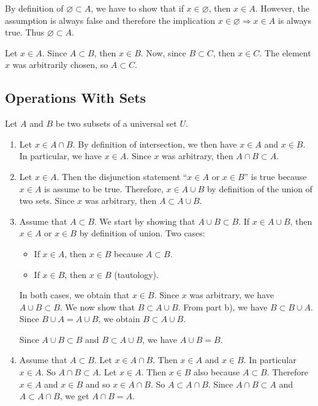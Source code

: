 \begin{problem}
By definition of $\varnothing \subset A$, we have to show that if $x \in \varnothing$, then $x \in A$. However, the assumption is always false and therefore the implication $x \in \varnothing \Rightarrow x \in A$ is always true. Thus $\varnothing \subset A$.
\end{problem}

\begin{problem}
Let $x \in A$. Since $A \subset B$, then $x \in B$. Now, since $B \subset C$, then $x \in C$. The element $x$ was arbitrarily chosen, so $A \subset C$.
\end{problem}

\subsection{Operations With Sets}

\begin{problem}
Let $A$ and $B$ be two subsets of a universal set $U$.
    \begin{enumerate}[label=\alph*)]
        \item Let $x \in A \cap B$. By definition of intersection, we then have $x \in A$ and $x \in B$. In particular, we have $x \in A$. Since $x$ was arbitrary, then $A \cap B \subset A$.
        \item Let $x \in A$. Then the disjunction statement ``$x \in A$ or $x \in B$'' is true because $x \in A$ is assume to be true. Therefore, $x \in A \cup B$ by definition of the union of two sets. Since $x$ was arbitrary, then $A \subset A \cup B$.
        \item Assume that $A \subset B$. 
        We start by showing that $A \cup B \subset B$. If $x \in A \cup B$, then $x \in A$ or $x \in B$ by definition of union. Two cases:
            \begin{itemize}
            \item If $x \in A$, then $x \in B$ because $A \subset B$.
            \item If $x \in B$, then $x \in B$ (tautology).
            \end{itemize}
        In both cases, we obtain that $x \in B$. Since $x$ was arbitrary, we have $A \cup B \subset B$. We now show that $B \subset A \cup B$. From part b), we have $B \subset B \cup A$. Since $B \cup A = A \cup B$, we obtain $B \subset A \cup B$.

        Since $A \cup B \subset B$ and $B \subset A \cup B$, we have $A \cup B = B$.
        \item Assume that $A \subset B$. Let $x \in A \cap B$. Then $x \in A$ and $x \in B$. In particular $x \in A$. So $A \cap B \subset A$. Let $x \in A$. Then $x \in B$ also because $A \subset B$. Therefore $x \in A$ and $x \in B$ and so $x \in A \cap B$. So $A \subset A \cap B$. Since $A \cap B \subset A$ and $A \subset A \cap B$, we get $A \cap B = A$.
    \end{enumerate}
\end{problem}

